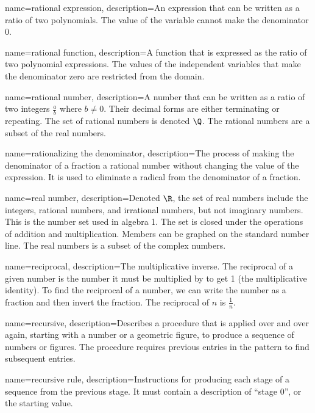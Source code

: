  {
	name=rational expression,
	description={An expression that can be written as a ratio of two polynomials. The value of the variable cannot make the denominator 0.}
}

 {
	name=rational function,
	description={A function that is expressed as the ratio of two polynomial expressions. The values of the independent variables that make the denominator zero are restricted from the domain.}
}

 {
	name=rational number,
	description={A number that can be written as a ratio of two integers $\frac{a}{b}$ where $b \neq 0$. Their decimal forms are either terminating or repeating. The set of rational numbers is denoted $\Q$. The rational numbers are a subset of the real numbers.}
}

 {
	name=rationalizing the denominator,
	description={The process of making the denominator of a fraction a rational number without changing the value of the expression. It is used to eliminate a radical from the denominator of a fraction.}
}

 {
	name=real number,
	description={Denoted $\R$, the set of real numbers include the integers, rational numbers, and irrational numbers, but not imaginary numbers. This is the number set used in algebra 1. The set is closed under the operations of addition and multiplication. Members can be graphed on the standard number line.  The real numbers is a subset of the complex numbers.}
}

 {
	name=reciprocal,
	description={The multiplicative inverse. The reciprocal of a given number is the number it must be multiplied by to get 1 (the multiplicative identity). To find the reciprocal of a number, we can write the number as a fraction and then invert the fraction. The reciprocal of $n$ is $\frac{1}{n}$.}
}

 {
	name=recursive,
	description={Describes a procedure that is applied over and over again, starting with a number or a geometric figure, to produce a sequence of numbers or figures. The procedure requires previous entries in the pattern to find subsequent entries.}
}

 {
	name=recursive rule,
	description={Instructions for producing each stage of a sequence from the previous stage. It must contain a description of ``stage 0'', or the starting value.}
}

